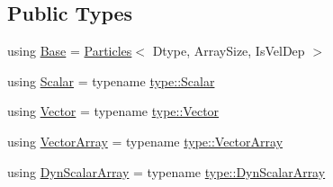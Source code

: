 \subsection*{Public Types}
\begin{DoxyCompactItemize}
\item 
using \mbox{\hyperlink{class_regu_particles_afcabde6e4f3c2648f37b23fee95758e0}{Base}} = \mbox{\hyperlink{struct_particles}{Particles}}$<$ Dtype, Array\+Size, Is\+Vel\+Dep $>$
\item 
using \mbox{\hyperlink{class_regu_particles_a91ab46dc1c711536776a28520485b5e4}{Scalar}} = typename \mbox{\hyperlink{struct_space_h_1_1_proto_type_af3c8245d83d9db64749882920de5c274}{type\+::\+Scalar}}
\item 
using \mbox{\hyperlink{class_regu_particles_a37d283e7ec44e971ddcbfe8897ef82ae}{Vector}} = typename \mbox{\hyperlink{struct_space_h_1_1_proto_type_a316b81f4660b2b4fab14a8e1f23b6089}{type\+::\+Vector}}
\item 
using \mbox{\hyperlink{class_regu_particles_a02f52b0d8ca1d8807b1745d0fecdf57b}{Vector\+Array}} = typename \mbox{\hyperlink{struct_space_h_1_1_proto_type_a622b8e122b33bb4966a02299fb7b82d6}{type\+::\+Vector\+Array}}
\item 
using \mbox{\hyperlink{class_regu_particles_abaa96fd6cb4ad1fca4a6c726480a0681}{Dyn\+Scalar\+Array}} = typename \mbox{\hyperlink{struct_space_h_1_1_proto_type_a8f3813f576517856e0ed74af9e5ffcb4}{type\+::\+Dyn\+Scalar\+Array}}
\end{DoxyCompactItemize}
